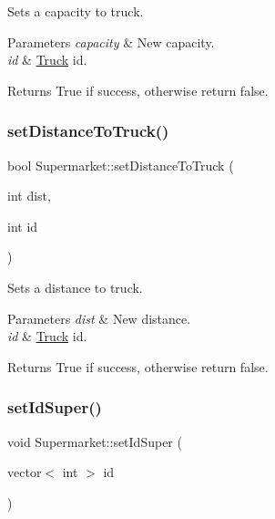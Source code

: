 Sets a capacity to truck. 


\begin{DoxyParams}{Parameters}
{\em capacity} & New capacity. \\
\hline
{\em id} & \hyperlink{class_truck}{Truck} id.\\
\hline
\end{DoxyParams}
\begin{DoxyReturn}{Returns}
True if success, otherwise return false. 
\end{DoxyReturn}
\mbox{\label{class_supermarket_a269aaf6964940e920d9706d0b433a47d}} 
\subsubsection{\texorpdfstring{set\+Distance\+To\+Truck()}{setDistanceToTruck()}}
{\footnotesize\ttfamily bool Supermarket\+::set\+Distance\+To\+Truck (\begin{DoxyParamCaption}\item[{int}]{dist,  }\item[{int}]{id }\end{DoxyParamCaption})}



Sets a distance to truck. 


\begin{DoxyParams}{Parameters}
{\em dist} & New distance. \\
\hline
{\em id} & \hyperlink{class_truck}{Truck} id.\\
\hline
\end{DoxyParams}
\begin{DoxyReturn}{Returns}
True if success, otherwise return false. 
\end{DoxyReturn}
\mbox{\label{class_supermarket_a51e31e345ce723c816739a98b8eea826}} 
\subsubsection{\texorpdfstring{set\+Id\+Super()}{setIdSuper()}}
{\footnotesize\ttfamily void Supermarket\+::set\+Id\+Super (\begin{DoxyParamCaption}\item[{vector$<$ int $>$}]{id }\end{DoxyParamCaption})}


